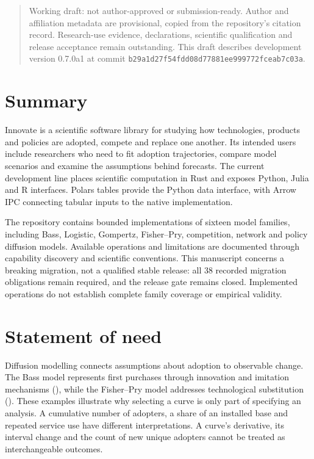 \documentclass[10pt,a4paper,onecolumn]{article}
\begin{document}
\begin{quote}
Working draft: not author-approved or submission-ready. Author and
affiliation metadata are provisional, copied from the repository's
citation record. Research-use evidence, declarations, scientific
qualification and release acceptance remain outstanding. This draft
describes development version 0.7.0a1 at commit
\texttt{b29a1d27f54fdd08d77881ee999772fceab7c03a}.
\end{quote}

\section{Summary}\label{summary}

Innovate is a scientific software library for studying how technologies,
products and policies are adopted, compete and replace one another. Its
intended users include researchers who need to fit adoption
trajectories, compare model scenarios and examine the assumptions behind
forecasts. The current development line places scientific computation in
Rust and exposes Python, Julia and R interfaces. Polars tables provide
the Python data interface, with Arrow IPC connecting tabular inputs to
the native implementation.

The repository contains bounded implementations of sixteen model
families, including Bass, Logistic, Gompertz, Fisher--Pry, competition,
network and policy diffusion models. Available operations and
limitations are documented through capability discovery and scientific
conventions. This manuscript concerns a breaking migration, not a
qualified stable release: all 38 recorded migration obligations remain
required, and the release gate remains closed. Implemented operations do
not establish complete family coverage or empirical validity.

\section{Statement of need}\label{statement-of-need}

Diffusion modelling connects assumptions about adoption to observable
change. The Bass model represents first purchases through innovation and
imitation mechanisms (), while the
Fisher--Pry model addresses technological substitution
(). These examples
illustrate why selecting a curve is only part of specifying an analysis.
A cumulative number of adopters, a share of an installed base and
repeated service use have different interpretations. A curve's
derivative, its interval change and the count of new unique adopters
cannot be treated as interchangeable outcomes.
\end{document}
